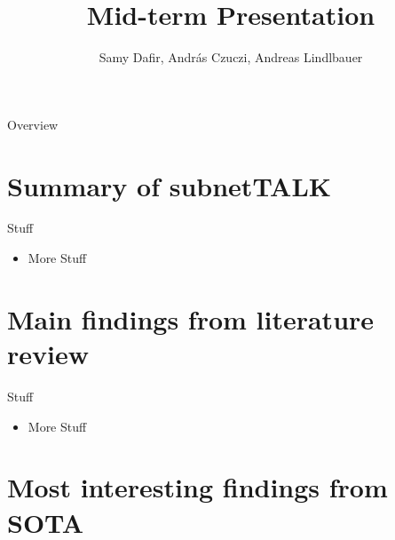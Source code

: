 \documentclass[10pt]{beamer}
\title{Mid-term Presentation}
\author{Samy Dafir, András Czuczi, Andreas Lindlbauer}
\date{}
\begin{document}
\begin{frame}
	\maketitle 
\end{frame}


\begin{frame}{Overview}
	\tableofcontents
\end{frame}


\section{Summary of subnetTALK}


\begin{frame}{Stuff}
	\begin{itemize}
        \pause{}
		\item More Stuff
	\end{itemize}	
\end{frame}


\section{Main findings from literature review}


\begin{frame}{Stuff}
	\begin{itemize}
        \pause{}
		\item More Stuff
	\end{itemize}	
\end{frame}


\section{Most interesting findings from SOTA}
\end{document}
